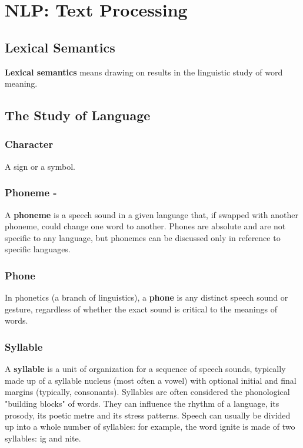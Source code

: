 \chapter{NLP: Text Processing}

\section{Lexical Semantics \cite{nlp-1}}

\textbf{Lexical semantics} means drawing on results in the linguistic study of word meaning.


\section{The Study of Language \cite{nlp-Thinking-like-a-Linguist}}\label{NLP: The Study of Language}


\subsection{Character \cite{wiki-character}}\label{language: Character}
A sign or a symbol.


\subsection{Phoneme - \cite{wiki-phone-phonetics}}\label{Language: Phoneme}
A \textbf{phoneme} is a speech sound in a given language that, if swapped with another phoneme, could change one word to another. Phones are absolute and are not specific to any language, but phonemes can be discussed only in reference to specific languages.


\subsection{Phone \cite{wiki-phone-phonetics}}\label{Language: Phone}
In phonetics (a branch of linguistics), a \textbf{phone} is any distinct speech sound or gesture, regardless of whether the exact sound is critical to the meanings of words.


\subsection{Syllable \cite{wiki-syllable}}\label{Language: Syllable}
A \textbf{syllable} is a unit of organization for a sequence of speech sounds, typically made up of a syllable nucleus (most often a vowel) with optional initial and final margins (typically, consonants). Syllables are often considered the phonological "building blocks" of words. They can influence the rhythm of a language, its prosody, its poetic metre and its stress patterns. Speech can usually be divided up into a whole number of syllables: for example, the word ignite is made of two syllables: ig and nite.


